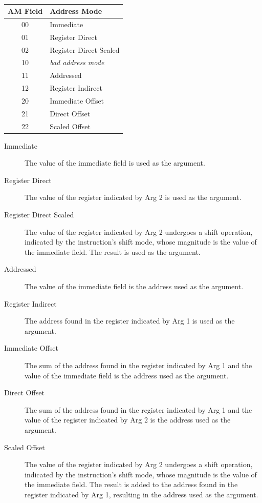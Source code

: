 \documentclass[12pt]{article}
\begin{document}
\begin{table}[h!]
    \centering
    \caption{}
    \label{tab:Address Modes}
    \begin{tabular}{|c|l|}
        \hline
        \textbf{AM} Field & Address Mode \\ \hline
        00 & Immediate \\ \hline
        01 & Register Direct \\ \hline
        02 & Register Direct Scaled \\ \hline
        10 & \textit{bad address mode} \\ \hline
        11 & Addressed \\ \hline
        12 & Register Indirect \\ \hline
        20 & Immediate Offset \\ \hline
        21 & Direct Offset \\ \hline
        22 & Scaled Offset \\ \hline
    \end{tabular}
\end{table}

\begin{description}
\item[Immediate] The value of the immediate field is used as the argument.
\item[Register Direct] The value of the register indicated by Arg 2 is used as the argument.
\item[Register Direct Scaled] The value of the register indicated by Arg 2 undergoes a shift
operation, indicated by the instruction's shift mode, whose magnitude is the value of the
immediate field. The result is used as the argument.
\item[Addressed] The value of the immediate field is the address used as the argument.
\item[Register Indirect] The address found in the register indicated by Arg 1 is used as the
argument.
\item[Immediate Offset] The sum of the address found in the register indicated by Arg 1 and
the value of the immediate field is the address used as the argument.
\item[Direct Offset] The sum of the address found in the register indicated by Arg 1 and the
value of the register indicated by Arg 2 is the address used as the argument.
\item[Scaled Offset] The value of the register indicated by Arg 2 undergoes a shift operation,
indicated by the instruction's shift mode, whose magnitude is the value of the immediate field.
The result is added to the address found in the register indicated by Arg 1, resulting in the
address used as the argument.
\end{description}
\end{document}
